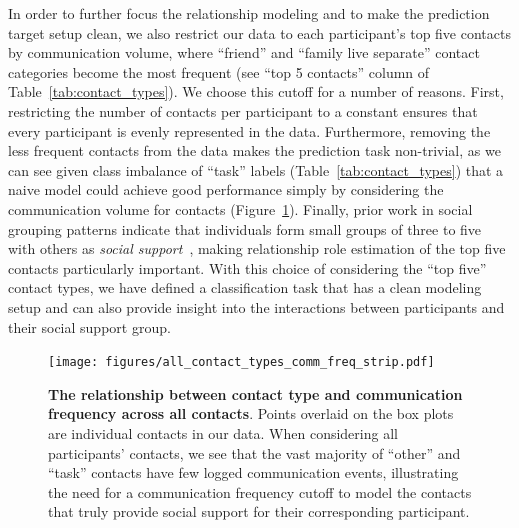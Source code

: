 \documentclass[acmlarge]{acmart}
\begin{document}
In order to further focus the relationship modeling and to make the prediction target setup clean, we also restrict our data to each participant's top five contacts by communication volume, where ``friend'' and ``family live separate'' contact categories become the most frequent (see ``top 5 contacts'' column of  Table~\ref{tab:contact_types}). We choose this cutoff for a number of reasons. First, restricting the number of contacts per participant to a constant ensures that every participant is evenly represented in the data. Furthermore, removing the less frequent contacts from the data makes the prediction task non-trivial, as we can see given class imbalance of ``task'' labels (Table~\ref{tab:contact_types}) that a naive model could achieve good performance simply by considering the communication volume for contacts (Figure~\ref{fig:comm_frequency}). Finally, prior work in social grouping patterns indicate that individuals form small groups of three to five with others as \textit{social support}~\cite{dunbar1995social, zhou2005discrete}, making relationship role estimation of the top five contacts particularly important. With this choice of considering the ``top five'' contact types, we have defined a classification task that has a clean modeling setup and can also provide insight into the interactions between participants and their social support group. 




\begin{figure}[h]
    \centering
    \texttt{[image: figures/all\_contact\_types\_comm\_freq\_strip.pdf]}
    \caption{\textbf{The relationship between contact type and communication frequency across all contacts}. Points overlaid on the box plots are individual contacts in our data. When considering all participants' contacts, we see that the vast majority of ``other'' and ``task'' contacts have few logged communication events, illustrating the need for a communication frequency cutoff to model the contacts that truly provide social support for their corresponding participant.}
    \label{fig:comm_frequency}
\end{figure}
\end{document}
